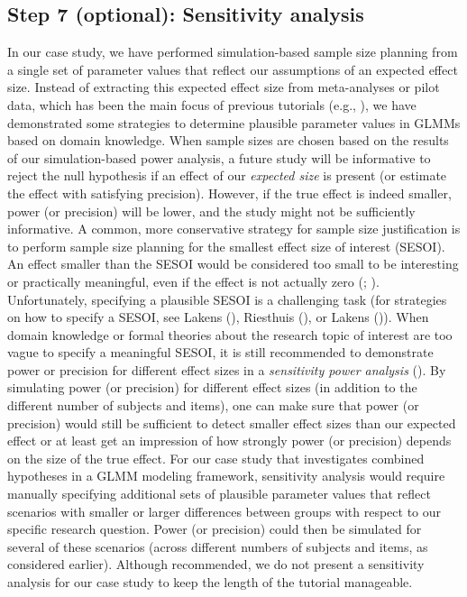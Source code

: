 \documentclass[
  man,
  floatsintext,
  longtable,
  a4paper,
  nolmodern,
  notxfonts,
  notimes,
  colorlinks=true,linkcolor=blue,citecolor=blue,urlcolor=blue]{apa7}
\begin{document}
\subsection{Step 7 (optional): Sensitivity
analysis}\label{step-7-optional-sensitivity-analysis}

In our case study, we have performed simulation-based sample size
planning from a single set of parameter values that reflect our
assumptions of an expected effect size. Instead of extracting this
expected effect size from meta-analyses or pilot data, which has been
the main focus of previous tutorials (e.g.,
),
we have demonstrated some strategies to determine plausible parameter
values in GLMMs based on domain knowledge. When sample sizes are chosen
based on the results of our simulation-based power analysis, a future
study will be informative to reject the null hypothesis if an effect of
our \emph{expected size} is present (or estimate the effect with
satisfying precision). However, if the true effect is indeed smaller,
power (or precision) will be lower, and the study might not be
sufficiently informative. A common, more conservative strategy for
sample size justification is to perform sample size planning for the
smallest effect size of interest (SESOI). An effect smaller than the
SESOI would be considered too small to be interesting or practically
meaningful, even if the effect is not actually zero
(;
). Unfortunately, specifying a plausible SESOI is a
challenging task (for strategies on how to specify a SESOI, see Lakens
(), Riesthuis
(), or
Lakens ()). When
domain knowledge or formal theories about the research topic of interest
are too vague to specify a meaningful SESOI, it is still recommended to
demonstrate power or precision for different effect sizes in a
\emph{sensitivity power analysis}
(). By
simulating power (or precision) for different effect sizes (in addition
to the different number of subjects and items), one can make sure that
power (or precision) would still be sufficient to detect smaller effect
sizes than our expected effect or at least get an impression of how
strongly power (or precision) depends on the size of the true effect.
For our case study that investigates combined hypotheses in a GLMM
modeling framework, sensitivity analysis would require manually
specifying additional sets of plausible parameter values that reflect
scenarios with smaller or larger differences between groups with respect
to our specific research question. Power (or precision) could then be
simulated for several of these scenarios (across different numbers of
subjects and items, as considered earlier). Although recommended, we do
not present a sensitivity analysis for our case study to keep the length
of the tutorial manageable.
\end{document}
